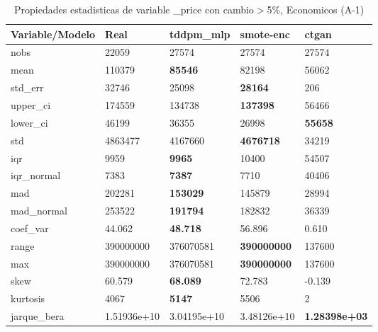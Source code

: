\begin{table}[H]
\centering
\fontsize{8}{14}\selectfont
\caption{Propiedades estadisticas de variable \_price con cambio\ensuremath{>}5\%, Economicos (A-1)}
\label{table-stats-economicos-a-1-_price-short}
\begin{tabular}{|l|m{10em}|m{10em}|m{10em}|m{10em}|}
\hline
 \rowcolor[gray]{0.8}
Variable/Modelo & Real & tddpm\_mlp & smote-enc & ctgan \\
\hline nobs & 22059 & 27574 & 27574 & 27574 \\
\hline mean & 110379 & \bfseries 85546 & 82198 & \cellcolor[rgb]{0.9, 0.54, 0.52} 56062 \\
\hline std\_err & 32746 & 25098 & \bfseries 28164 & \cellcolor[rgb]{0.9, 0.54, 0.52} 206 \\
\hline upper\_ci & 174559 & 134738 & \bfseries 137398 & \cellcolor[rgb]{0.9, 0.54, 0.52} 56466 \\
\hline lower\_ci & 46199 & 36355 & \cellcolor[rgb]{0.9, 0.54, 0.52} 26998 & \bfseries 55658 \\
\hline std & 4863477 & 4167660 & \bfseries 4676718 & \cellcolor[rgb]{0.9, 0.54, 0.52} 34219 \\
\hline iqr & 9959 & \bfseries 9965 & 10400 & \cellcolor[rgb]{0.9, 0.54, 0.52} 54507 \\
\hline iqr\_normal & 7383 & \bfseries 7387 & 7710 & \cellcolor[rgb]{0.9, 0.54, 0.52} 40406 \\
\hline mad & 202281 & \bfseries 153029 & 145879 & \cellcolor[rgb]{0.9, 0.54, 0.52} 28994 \\
\hline mad\_normal & 253522 & \bfseries 191794 & 182832 & \cellcolor[rgb]{0.9, 0.54, 0.52} 36339 \\
\hline coef\_var & 44.062 & \bfseries 48.718 & 56.896 & \cellcolor[rgb]{0.9, 0.54, 0.52} 0.610 \\
\hline range & 390000000 & 376070581 & \bfseries 390000000 & \cellcolor[rgb]{0.9, 0.54, 0.52} 137600 \\
\hline max & 390000000 & 376070581 & \bfseries 390000000 & \cellcolor[rgb]{0.9, 0.54, 0.52} 137600 \\
\hline skew & 60.579 & \bfseries 68.089 & 72.783 & \cellcolor[rgb]{0.9, 0.54, 0.52} -0.139 \\
\hline kurtosis & 4067 & \bfseries 5147 & 5506 & \cellcolor[rgb]{0.9, 0.54, 0.52} 2 \\
\hline jarque\_bera & 1.51936e+10 & 3.04195e+10 & \cellcolor[rgb]{0.9, 0.54, 0.52} 3.48126e+10 & \bfseries 1.28398e+03 \\

\end{tabular}
\end{table}
